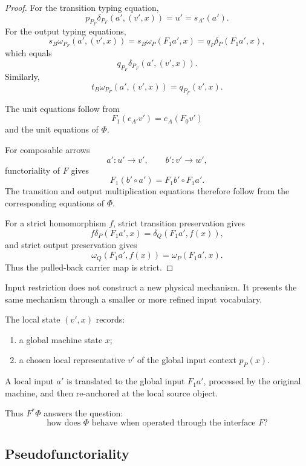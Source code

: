 \begin{proof}
For the transition typing equation,
\[
    p_{P_F}
    \delta_{P_F}(a',(v',x))
    =
    u'
    =
    s_{A'}(a').
\]
For the output typing equations,
\[
    s_B\omega_{P_F}(a',(v',x))
    =
    s_B\omega_P(F_1a',x)
    =
    q_P\delta_P(F_1a',x),
\]
which equals
\[
    q_{P_F}\delta_{P_F}(a',(v',x)).
\]
Similarly,
\[
    t_B\omega_{P_F}(a',(v',x))
    =
    q_{P_F}(v',x).
\]

The unit equations follow from
\[
    F_1(e_{A'}v')=e_A(F_0v')
\]
and the unit equations of \(\Phi\).

For composable arrows
\[
    a':u'\to v',
    \qquad
    b':v'\to w',
\]
functoriality of \(F\) gives
\[
    F_1(b'\circ a')
    =
    F_1b'\circ F_1a'.
\]
The transition and output multiplication equations therefore follow from the
corresponding equations of \(\Phi\).

For a strict homomorphism \(f\), strict transition preservation gives
\[
    f\delta_P(F_1a',x)
    =
    \delta_Q(F_1a',f(x)),
\]
and strict output preservation gives
\[
    \omega_Q(F_1a',f(x))
    =
    \omega_P(F_1a',x).
\]
Thus the pulled-back carrier map is strict.
\end{proof}

\begin{remark}
\label{rem:systems-interpretation-input-restriction}
Input restriction does not construct a new physical mechanism. It presents the
same mechanism through a smaller or more refined input vocabulary.

The local state \((v',x)\) records:
\begin{enumerate}
    \item a global machine state \(x\);
    \item a chosen local representative \(v'\) of the global input context
    \(p_P(x)\).
\end{enumerate}
A local input \(a'\) is translated to the global input \(F_1a'\), processed by
the original machine, and then re-anchored at the local source object.

Thus \(F^\ast\Phi\) answers the question:
\[
    \text{how does \(\Phi\) behave when operated through the interface \(F\)?}
\]
\end{remark}

\subsection{Pseudofunctoriality}
\label{subsec:input-pullback-pseudofunctoriality}

